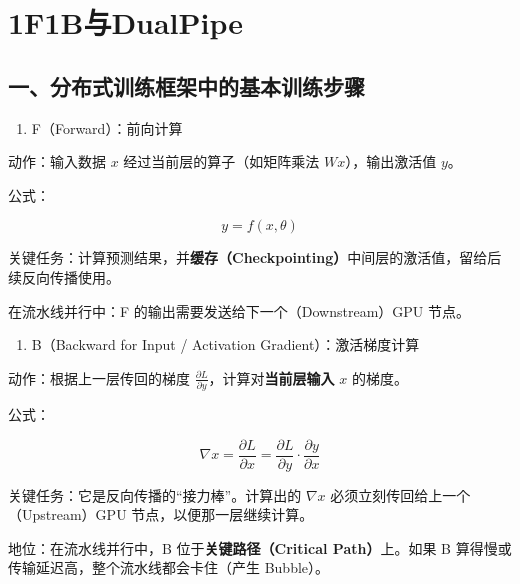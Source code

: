 \setcounter{section}{3}

\hypertarget{f1bux4e0edualpipe}{%
\section{1F1B与DualPipe}\label{f1bux4e0edualpipe}}

\hypertarget{ux4e00ux5206ux5e03ux5f0fux8badux7ec3ux6846ux67b6ux4e2dux7684ux57faux672cux8badux7ec3ux6b65ux9aa4}{%
\subsection{一、分布式训练框架中的基本训练步骤}\label{ux4e00ux5206ux5e03ux5f0fux8badux7ec3ux6846ux67b6ux4e2dux7684ux57faux672cux8badux7ec3ux6b65ux9aa4}}

\begin{enumerate}
\def\labelenumi{\arabic{enumi}.}
\tightlist
\item
  F（Forward）：前向计算
\end{enumerate}

动作：输入数据 \(x\) 经过当前层的算子（如矩阵乘法 \(Wx\)），输出激活值 \(y\)。

公式：

\[
y = f(x, \theta)
\]

关键任务：计算预测结果，并\textbf{缓存（Checkpointing）}中间层的激活值，留给后续反向传播使用。

在流水线并行中：F 的输出需要发送给下一个（Downstream）GPU 节点。

\begin{enumerate}
\def\labelenumi{\arabic{enumi}.}
\setcounter{enumi}{1}
\tightlist
\item
  B（Backward for Input / Activation Gradient）：激活梯度计算
\end{enumerate}

动作：根据上一层传回的梯度 \(\frac{\partial L}{\partial y}\)，计算对\textbf{当前层输入} \(x\) 的梯度。

公式：

\[
\nabla x = \frac{\partial L}{\partial x} = \frac{\partial L}{\partial y} \cdot \frac{\partial y}{\partial x}
\]

关键任务：它是反向传播的``接力棒''。计算出的 \(\nabla x\) 必须立刻传回给上一个（Upstream）GPU 节点，以便那一层继续计算。

地位：在流水线并行中，B 位于\textbf{关键路径（Critical Path）}上。如果 B 算得慢或传输延迟高，整个流水线都会卡住（产生 Bubble）。

